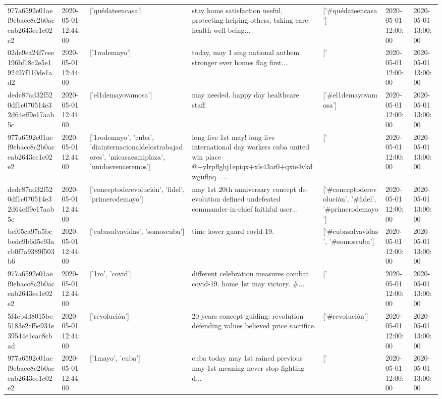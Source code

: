 \begin{tabular}{lllllll}
977a6592e01aef9ebacc8c2b0aceab2643ee1c02e2 & 2020-05-01 12:44:00 & ['quédateencasa'] & stay home satisfaction useful, protecting helping others, taking care health well-being... & ['#quédateencasa'] & 2020-05-01 12:00:00 & 2020-05-01 13:00:00 \\
02de9ea24f7eee196bf18c2e5e192497f110de1ad2 & 2020-05-01 12:44:00 & ['1rodemayo'] & today, may 1 sing national anthem stronger ever homes flag first... & ['#1rodemayo'] & 2020-05-01 12:00:00 & 2020-05-01 13:00:00 \\
dedc87ad32f520df1c070514e32d64eff9e17aab5c & 2020-05-01 12:44:00 & ['el1demayovamosa'] & may needed. happy day healthcare staff. & ['#el1demayovamosa'] & 2020-05-01 12:00:00 & 2020-05-01 13:00:00 \\
977a6592e01aef9ebacc8c2b0aceab2643ee1c02e2 & 2020-05-01 12:44:00 & ['1rodemayo', 'cuba', 'diainternacionaldelostrabajadores', 'micasaesmiplaza', 'unidosvenceremos'] & long live 1st may! long live international day workers cuba united win place @+ylrpflghj1epiqx+xls43ar0+qxie4vkdwguflnq=... & ['#1rodemayo', '#cuba', '#diainternacionaldelostrabajadores', '#micasaesmiplaza', '#unidosvenceremos'] & 2020-05-01 12:00:00 & 2020-05-01 13:00:00 \\
dedc87ad32f520df1c070514e32d64eff9e17aab5c & 2020-05-01 12:44:00 & ['conceptoderevolución', 'fidel', 'primerodemayo'] & may 1st 20th anniversary concept de-evolution defined undefeated commander-in-chief faithful user... & ['#conceptoderevolución', '#fidel', '#primerodemayo'] & 2020-05-01 12:00:00 & 2020-05-01 13:00:00 \\
bef05ca97a5bcbedc9b6d5e93acb0f7a9389f503b6 & 2020-05-01 12:44:00 & ['cubasalvavidas', 'somoscuba'] & time lower guard covid-19. & ['#cubasalvavidas', '#somoscuba'] & 2020-05-01 12:00:00 & 2020-05-01 13:00:00 \\
977a6592e01aef9ebacc8c2b0aceab2643ee1c02e2 & 2020-05-01 12:44:00 & ['1ro', 'covid'] & different celebration measures combat covid-19. home 1st may victory. \#... & ['#1ro', '#covid'] & 2020-05-01 12:00:00 & 2020-05-01 13:00:00 \\
5f4cb4d8015be5183e2cf5e934e39544e1cac8cbad & 2020-05-01 12:44:00 & ['revolución'] & 20 years concept guiding: revolution defending values believed price sacrifice. & ['#revolución'] & 2020-05-01 12:00:00 & 2020-05-01 13:00:00 \\
977a6592e01aef9ebacc8c2b0aceab2643ee1c02e2 & 2020-05-01 12:44:00 & ['1mayo', 'cuba'] & cuba today may 1st rained previous may 1st meaning never stop fighting d... & ['#1mayo', '#cuba'] & 2020-05-01 12:00:00 & 2020-05-01 13:00:00 \\

\end{tabular}
